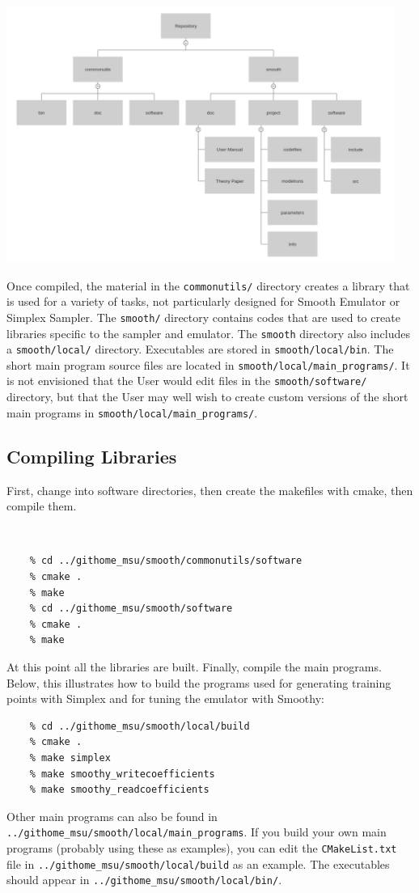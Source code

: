 \documentclass[main.tex]{subfiles}
\begin{document}
\centerline{\includegraphics[width = 0.95\textwidth]{Structure_Tree.png}}

Once compiled, the material in the {\tt commonutils/} directory creates a library that is used for a variety of tasks, not particularly designed for Smooth Emulator or Simplex Sampler. The {\tt smooth/} directory contains codes that are used to create libraries specific to the sampler and emulator. The {\tt smooth} directory also includes a {\tt smooth/local/} directory. Executables are stored in {\tt smooth/local/bin}. The short main program source files are located in {\tt smooth/local/main\_programs/}. It is not envisioned that the User would edit files in the {\tt smooth/software/} directory, but that the User may well wish to create custom versions of the short main programs in {\tt smooth/local/main\_programs/}.

\subsection{Compiling Libraries }

First, change into software directories, then create the makefiles with cmake, then compile them.\\
\vspace{-20pt}
{\tt 
\begin{verbatim}
    % cd ../githome_msu/smooth/commonutils/software
    % cmake .
    % make
    % cd ../githome_msu/smooth/software
    % cmake .
    % make
\end{verbatim}
At this point all the libraries are built. Finally, compile the main programs. Below, this illustrates how to build the programs used for generating training points with Simplex and for tuning the emulator with Smoothy:
\begin{verbatim}
    % cd ../githome_msu/smooth/local/build
    % cmake .
    % make simplex
    % make smoothy_writecoefficients
    % make smoothy_readcoefficients
\end{verbatim}
}
Other main programs can also be found in {\tt ../githome\_msu/smooth/local/main\_programs}. If you build your own main programs (probably using these as examples), you can edit the {\tt CMakeList.txt} file in {\tt ../githome\_msu/smooth/local/build} as an example. The executables should appear in {\tt ../githome\_msu/smooth/local/bin/}. 
\end{document}
